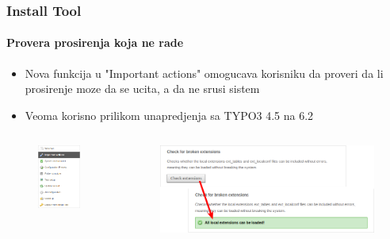 \begin{frame}[fragile]
	\frametitle{Install Tool}
	\framesubtitle{Provera prosirenja koja ne rade}

	\begin{itemize}
		\item Nova funkcija u "Important actions" omogucava korisniku da proveri\newline
			da li prosirenje moze da se ucita, a da ne srusi sistem
		\item Veoma korisno prilikom unapredjenja sa TYPO3 4.5 na 6.2
	\end{itemize}

	\begin{columns}[T]
		\begin{column}{.3\textwidth}
			\begin{figure}\vspace*{-0.4cm}
				\includegraphics[width=0.7\linewidth]{Images/InstallTool/ImportantActions.png}
			\end{figure}
		\end{column}
		\begin{column}{.7\textwidth}
			\begin{figure}\vspace*{-0.4cm}
				\includegraphics[width=1\linewidth]{Images/InstallTool/CheckForBrokenExtensions.png}
			\end{figure}
		\end{column}
	\end{columns}


\end{frame}
